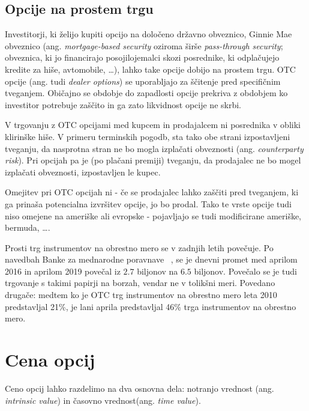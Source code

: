 \documentclass[a4paper]{article}
\begin{document}
\subsection{Opcije na prostem trgu}
Investitorji, ki želijo kupiti opcijo na določeno državno obveznico, Ginnie Mae obveznico (ang. \textit{mortgage-based security} oziroma širše \textit{pass-through security};
obveznica, ki jo financirajo posojilojemalci skozi posrednike, ki odplačujejo kredite za hiše, avtomobile, \ldots), lahko take opcije dobijo na prostem trgu.
OTC opcije (ang. tudi \textit{dealer options}) se uporabljajo za ščitenje pred specifičnim tveganjem. Običajno se obdobje do zapadlosti opcije prekriva z obdobjem 
ko investitor potrebuje zaščito in ga zato likvidnost opcije ne skrbi.

V trgovanju z OTC opcijami med kupcem in prodajalcem ni posrednika v obliki klirinške hiše. V primeru terminskih pogodb, sta tako
obe strani izpostavljeni tveganju, da nasprotna stran ne bo mogla izplačati obveznosti (ang. \textit{counterparty risk}). Pri opcijah
pa je (po plačani premiji) tveganju, da prodajalec ne bo mogel izplačati obveznosti, izpostavljen le kupec.

Omejitev pri OTC opcijah ni - če se prodajalec lahko zaščiti pred tveganjem, ki ga prinaša potencialna izvršitev opcije, jo bo prodal.
Tako te vrste opcije tudi niso omejene na ameriške ali evropske - pojavljajo se tudi modificirane ameriške, bermuda, \ldots.

Prosti trg instrumentov na obrestno mero se v zadnjih letih povečuje. Po navedbah Banke za mednarodne poravnave ~\cite{bis}, se je dnevni promet
med aprilom 2016 in aprilom 2019 povečal iz \textdollar$2.7$ biljonov na \textdollar$6.5$ biljonov. Povečalo se je tudi trgovanje s takimi papirji na borzah, 
vendar ne v tolikšni meri. Povedano drugače: medtem ko je OTC trg instrumentov na obrestno mero leta 2010 predstavljal 21\%, je lani aprila predstavljal
46\% trga instrumentov na obrestno mero. 

\section{Cena opcij} \label{cenaopcij}
Ceno opcij lahko razdelimo na dva osnovna dela: notranjo vrednost (ang. \textit{intrinsic value}) in časovno vrednost(ang. \textit{time value}).
\end{document}
